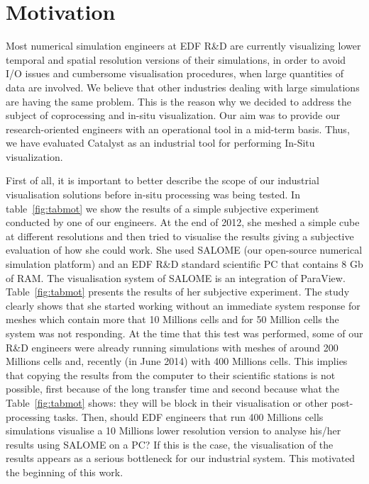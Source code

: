 \section{Motivation}
\label{sec:motivation}

Most numerical simulation engineers at EDF R\&D are currently visualizing lower
temporal and spatial resolution versions of their simulations, in order to avoid
I/O issues and cumbersome visualisation procedures, when large quantities of
data are involved. We believe that other industries dealing with large
simulations are having the same problem. This is the reason why we decided to
address the subject of coprocessing and in-situ visualization. Our aim was to
provide our research-oriented engineers with an operational tool in a mid-term
basis. Thus, we have evaluated Catalyst as an industrial tool for performing
In-Situ visualization. 

First of all, it is important to better describe the scope of our industrial
visualisation solutions before in-situ processing was being tested. In
table~\ref{fig:tabmot}
we show the results of a simple subjective experiment conducted by one of our
engineers. At the end of 2012, she meshed a simple cube at different resolutions
and then tried to visualise the results giving a subjective evaluation of how
she could work. She used SALOME (our open-source numerical simulation platform)
and an EDF R\&D standard scientific PC that contains 8 Gb of RAM. The
visualisation system of SALOME is an integration of ParaView.
Table~\ref{fig:tabmot} presents
the results of her subjective experiment. The study clearly shows that she
started working without an immediate system response for meshes which contain
more that 10 Millions cells and for 50 Million cells the system was not
responding. At the time that this test was performed, some of our R\&D engineers
were already running simulations with meshes of around 200 Millions cells and,
recently (in June 2014) with 400 Millions cells. This implies that copying the
results from the computer to their scientific stations is not possible, first
because of the long transfer time and second because what the
Table~\ref{fig:tabmot} shows:
they will be block in their visualisation or other post-processing tasks. Then,
should EDF engineers that run 400 Millions cells simulations visualise a 10
Millions lower resolution version to analyse his/her results using SALOME on a
PC? If this is the case, the visualisation of the results appears as a serious
bottleneck for our industrial system. This motivated the beginning of this work.

